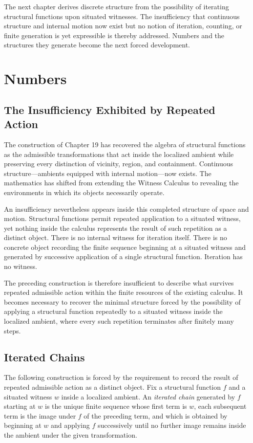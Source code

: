 \documentclass[12pt,anyside]{book}
\newcommand{\term}[1]{\textit{#1}}             %
\begin{document}
\begin{futurework}
The next chapter derives discrete structure from the possibility of iterating structural functions upon situated witnesses. The insufficiency that continuous structure and internal motion now exist but no notion of iteration, counting, or finite generation is yet expressible is thereby addressed. Numbers and the structures they generate become the next forced development.
\end{futurework}

\chapter{Numbers}

\section{The Insufficiency Exhibited by Repeated Action}
The construction of Chapter 19 has recovered the algebra of structural functions as the admissible transformations that act inside the localized ambient while preserving every distinction of vicinity, region, and containment. Continuous structure---ambients equipped with internal motion---now exists. The mathematics has shifted from extending the Witness Calculus to revealing the environments in which its objects necessarily operate.

An insufficiency nevertheless appears inside this completed structure of space and motion. Structural functions permit repeated application to a situated witness, yet nothing inside the calculus represents the result of such repetition as a distinct object. There is no internal witness for iteration itself. There is no concrete object recording the finite sequence beginning at a situated witness and generated by successive application of a single structural function. Iteration has no witness. 

The preceding construction is therefore insufficient to describe what survives repeated admissible action within the finite resources of the existing calculus. It becomes necessary to recover the minimal structure forced by the possibility of applying a structural function repeatedly to a situated witness inside the localized ambient, where every such repetition terminates after finitely many steps.

\section{Iterated Chains}
The following construction is forced by the requirement to record the result of repeated admissible action as a distinct object. Fix a structural function $f$ and a situated witness $w$ inside a localized ambient. An \term{iterated chain} generated by $f$ starting at $w$ is the unique finite sequence whose first term is $w$, each subsequent term is the image under $f$ of the preceding term, and which is obtained by beginning at $w$ and applying $f$ successively until no further image remains inside the ambient under the given transformation.
\end{document}
